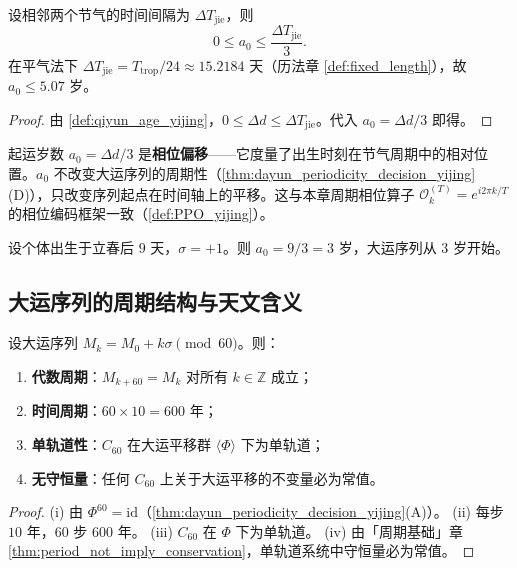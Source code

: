 \begin{proposition}[起运岁数的量化界]\label{prop:qiyun_age_bound_yijing}
设相邻两个节气的时间间隔为 $\Delta T_{\text{jie}}$，则
\[
0\le a_0\le \frac{\Delta T_{\text{jie}}}{3}.
\]
在平气法下 $\Delta T_{\text{jie}}=T_{\text{trop}}/24\approx 15.2184$ 天（历法章 \cref{def:fixed_length}），故 $a_0\le 5.07$ 岁。
\end{proposition}

\begin{proof}
由 \cref{def:qiyun_age_yijing}，$0\le\Delta d\le\Delta T_{\text{jie}}$。代入 $a_0=\Delta d/3$ 即得。
\end{proof}

\begin{remark}[起运岁数的相位解释]\label{rem:qiyun_phase_yijing}
起运岁数 $a_0=\Delta d/3$ 是\textbf{相位偏移}——它度量了出生时刻在节气周期中的相对位置。$a_0$ 不改变大运序列的周期性（\cref{thm:dayun_periodicity_decision_yijing}(D)），只改变序列起点在时间轴上的平移。这与本章周期相位算子 $\mathcal O_k^{(T)}=e^{i2\pi k/T}$ 的相位编码框架一致（\cref{def:PPO_yijing}）。
\end{remark}

\begin{example}[起运岁数的数值计算]\label{ex:qiyun_calc_yijing}
设个体出生于立春后 $9$ 天，$\sigma=+1$。则 $a_0=9/3=3$ 岁，大运序列从 $3$ 岁开始。
\end{example}

\subsection{大运序列的周期结构与天文含义}

\begin{theorem}[大运序列的周期结构]\label{thm:dayun_periodicity_yijing}
设大运序列 $M_k=M_0+k\sigma\pmod{60}$。则：
\begin{enumerate}[label=(\roman*)]
    \item \textbf{代数周期}：$M_{k+60}=M_k$ 对所有 $k\in\mathbb Z$ 成立；
    \item \textbf{时间周期}：$60\times 10=600$ 年；
    \item \textbf{单轨道性}：$C_{60}$ 在大运平移群 $\langle\Phi\rangle$ 下为单轨道；
    \item \textbf{无守恒量}：任何 $C_{60}$ 上关于大运平移的不变量必为常值。
\end{enumerate}
\end{theorem}

\begin{proof}
(i) 由 $\Phi^{60}=\mathrm{id}$（\cref{thm:dayun_periodicity_decision_yijing}(A)）。
(ii) 每步 $10$ 年，$60$ 步 $600$ 年。
(iii) $C_{60}$ 在 $\Phi$ 下为单轨道。
(iv) 由「周期基础」章 \cref{thm:period_not_imply_conservation}，单轨道系统中守恒量必为常值。
\end{proof}

